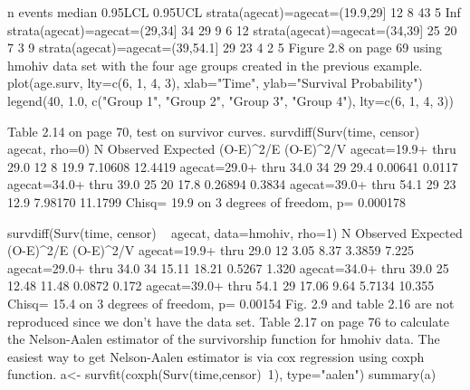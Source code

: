 	
	n events median 0.95LCL 0.95UCL
	strata(agecat)=agecat=(19.9,29] 12      8     43       5     Inf
	strata(agecat)=agecat=(29,34]   34     29      9       6      12
	strata(agecat)=agecat=(34,39]   25     20      7       3       9
	strata(agecat)=agecat=(39,54.1] 29     23      4       2       5
	Figure 2.8 on page 69 using hmohiv data set with the four age groups created in the previous example.
	plot(age.surv, lty=c(6, 1, 4, 3), xlab="Time", ylab="Survival Probability")
	legend(40, 1.0, c("Group 1", "Group 2", "Group 3", "Group 4"), lty=c(6, 1, 4, 3))
	
	Table 2.14 on page 70, test on survivor curves.
	survdiff(Surv(time, censor) ~ agecat, rho=0)
	N Observed Expected (O-E)^2/E (O-E)^2/V 
	agecat=19.9+ thru 29.0 12        8     19.9   7.10608   12.4419
	agecat=29.0+ thru 34.0 34       29     29.4   0.00641    0.0117
	agecat=34.0+ thru 39.0 25       20     17.8   0.26894    0.3834
	agecat=39.0+ thru 54.1 29       23     12.9   7.98170   11.1799
	Chisq= 19.9 on 3 degrees of freedom, p= 0.000178
	
	survdiff(Surv(time, censor) ~ agecat, data=hmohiv, rho=1)
	N Observed Expected (O-E)^2/E (O-E)^2/V 
	agecat=19.9+ thru 29.0 12     3.05     8.37    3.3859     7.225
	agecat=29.0+ thru 34.0 34    15.11    18.21    0.5267     1.320
	agecat=34.0+ thru 39.0 25    12.48    11.48    0.0872     0.172
	agecat=39.0+ thru 54.1 29    17.06     9.64    5.7134    10.355
	Chisq= 15.4 on 3 degrees of freedom, p= 0.00154 
	Fig. 2.9 and table 2.16 are not reproduced since we don't have the data set.
	Table 2.17 on page 76 to calculate the Nelson-Aalen estimator of the survivorship function for hmohiv data. The easiest way to get Nelson-Aalen estimator is via cox regression using coxph function.
	a<- survfit(coxph(Surv(time,censor)~1), type="aalen")
	summary(a)
	
